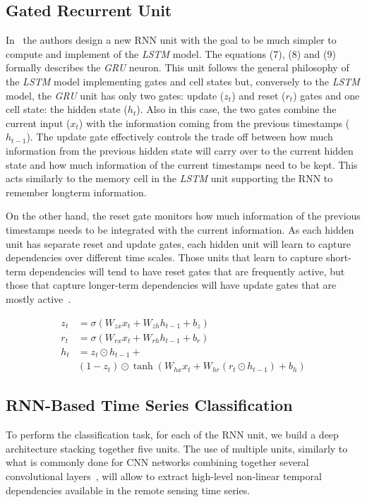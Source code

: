 \documentclass[journal, onecolumn]{IEEEtran}
\begin{document}
\subsection{Gated Recurrent Unit}

In~\cite{ChoMGBBSB14} the authors design a new RNN unit with the goal to be much simpler to compute and implement of the \textit{LSTM} model.
The equations (7), (8) and (9) formally describes the \textit{GRU} neuron. 
This unit follows the general philosophy of the \textit{LSTM} model implementing gates and cell states but, conversely to the \textit{LSTM} model, the \textit{GRU} unit has only two gates: update ($z_t$) and reset ($r_t$) gates and one cell state: the hidden state ($h_t$). 
Also in this case, the two gates combine the current input ($x_t$) with the information coming from the previous timestamps ($h_{t-1}$).
The update gate effectively controls the trade off between how much information from the previous hidden state will carry over to the current hidden state and how much information of the current timestamps need to be kept. This acts similarly to the memory cell in the \textit{LSTM}
unit supporting the RNN to remember longterm information.

On the other hand, the reset gate monitors how much information of the previous timestamps needs to be integrated with the current information. 
As each hidden unit has separate reset and update gates, each hidden unit will learn to capture dependencies over different time scales. Those
units that learn to capture short-term dependencies will tend to have reset gates that are frequently active, but those that capture longer-term dependencies will have update gates that are mostly active~\cite{ChoMGBBSB14}.

\begin{align*}
z_{t} &= \sigma(W_{zx} x_{t} + W_{zh} h_{t-1} + b_z  ) \tag{7} \\
r_{t} &= \sigma(W_{rx} x_{t} + W_{rh} h_{t-1} + b_r  ) \tag{8} \\
h_{t} &= z_t \odot h_{t-1} +  \tag{9} \\
& (1-z_t) \odot \tanh( W_{hx} x_{t} + W_{hr} (r_t \odot h_{t-1})+b_h  )
\end{align*}



\subsection{RNN-Based Time Series Classification\label{sec:IRF-3} }
To perform the classification task, for each of the RNN unit, we build a deep architecture stacking together five units. The use of multiple units, similarly to what is commonly done for CNN networks combining together several convolutional layers~\cite{BengioCV13}, will allow to extract high-level non-linear temporal dependencies available in the remote sensing time series.
\end{document}
